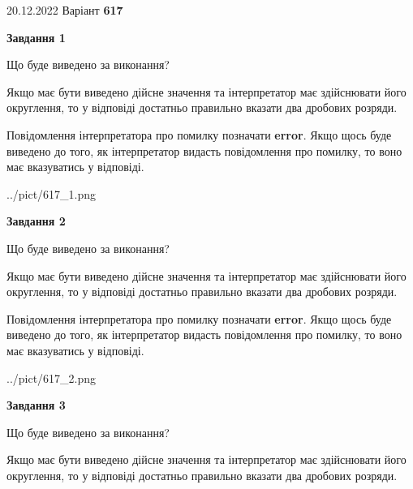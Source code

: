 \documentclass[12pt, ukrainian]{article}
\begin{document}
{20.12.2022 Варіант \No \textbf { 617 }\par}
{
\begin {Large}

{\begin {center}\textbf{Завдання 1}\end {center}}\par
Що буде виведено за виконання? \par

Якщо має бути виведено дійсне значення та інтерпретатор має здійснювати його округлення, 
то у відповіді достатньо правильно вказати два дробових розряди.

Повідомлення інтерпретатора про помилку позначати \textbf{error}.
Якщо щось буде виведено до того, як інтерпретатор видасть повідомлення про помилку, 
то воно має вказуватись у відповіді. \par

\begin{center}
	{../pict/617_1.png}
\end{center}
\newpage

{\begin {center}\textbf{Завдання 2}\end {center}}\par
Що буде виведено за виконання? \par

Якщо має бути виведено дійсне значення та інтерпретатор має здійснювати його округлення, 
то у відповіді достатньо правильно вказати два дробових розряди.

Повідомлення інтерпретатора про помилку позначати \textbf{error}.
Якщо щось буде виведено до того, як інтерпретатор видасть повідомлення про помилку, 
то воно має вказуватись у відповіді. \par

\begin{center}
	{../pict/617_2.png}
\end{center}
\newpage

{\begin {center}\textbf{Завдання 3}\end {center}}\par
Що буде виведено за виконання? \par

Якщо має бути виведено дійсне значення та інтерпретатор має здійснювати його округлення, 
то у відповіді достатньо правильно вказати два дробових розряди.


\end{Large}}
\end{document}

